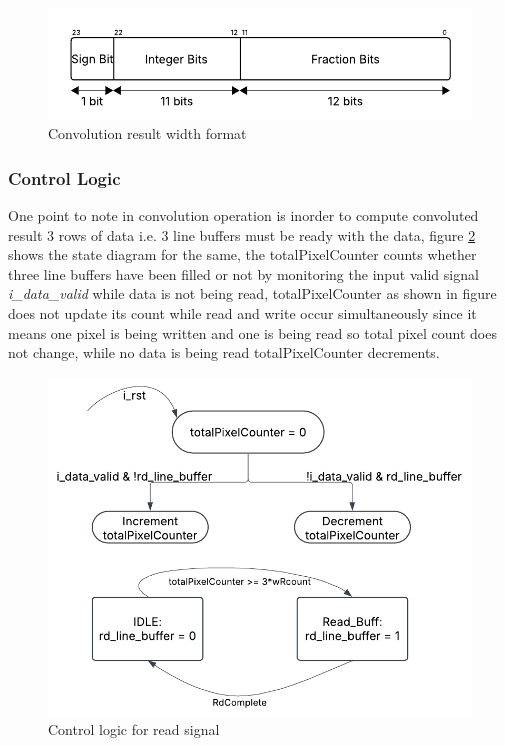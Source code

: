     \begin{figure}[H]
        \centering
        \includegraphics[width=\textwidth]{images/conv_result.png}
        \caption{Convolution result width format}
        \label{fig:conv_result}
    \end{figure}

    \subsubsection{Control Logic}
    \noindent
    One point to note in convolution operation is inorder to compute convoluted result 3 rows of data i.e. 3 line buffers must be ready with the data, figure \ref{fig:threeLineBuffcontrol} shows the state diagram for the same, the totalPixelCounter counts whether three line buffers have been filled or not by monitoring the input valid signal \textit{i\_data\_valid} while data is not being read, totalPixelCounter as shown in figure does not update its count while read and write occur simultaneously since it means one pixel is being written and one is being read so total pixel count does not change, while no data is being read totalPixelCounter decrements. 

    \begin{figure}[H]
    \centering
    \includegraphics[width=0.75\linewidth]{images/readTotalCount.png}
    \caption{Control logic for read signal}
    \label{fig:threeLineBuffcontrol}
    \end{figure}

